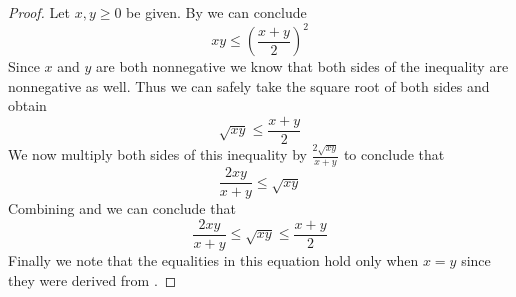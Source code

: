        \begin{proof}
            Let $x, y \ge 0$ be given. By  we can conclude
            \[
                xy \le \left(\frac{x + y}{2}\right)^2
            \]
            Since $x$ and $y$ are both nonnegative we know that both sides of the inequality
            are nonnegative as well. Thus we can safely take the square root of both sides
            and obtain
            \begin{equation}
                \label{AGM 1}
                \sqrt{xy} \le \frac{x + y}{2}
            \end{equation}
            We now multiply both sides of this inequality by $\frac{2\sqrt{xy}}{x + y}$ to
            conclude that
            \begin{equation}
                \label{AGM 2}
                \frac{2xy}{x + y} \le \sqrt{xy}
            \end{equation}
            Combining  and  we can conclude that
            \[
                \frac{2xy}{x + y} \le \sqrt{xy} \le \frac{x + y}{2}
            \]
            Finally we note that the equalities in this equation hold only when $x = y$
            since they were derived from . \QED
        \end{proof}
